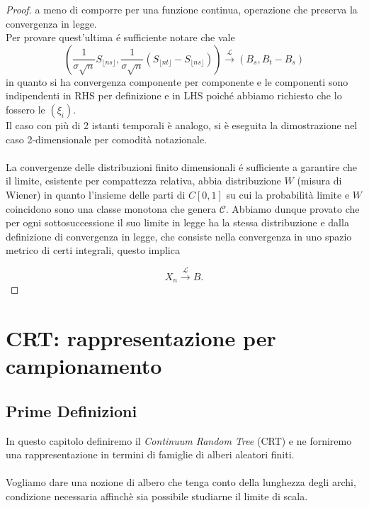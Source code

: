 \documentclass[11pt, twoside]{report}
\theoremstyle{definition}
\theoremstyle{plain}
\theoremstyle{remark}
\numberwithin{equation}{chapter}
\begin{document}
\begin{proof}
a meno di comporre per una funzione continua, operazione che preserva la convergenza in legge. \\
Per provare quest'ultima \'e sufficiente notare che vale 
$$\left(\frac{1}{\sigma \sqrt n}S_{\lfloor ns \rfloor}, \frac{1}{\sigma \sqrt n}\left(S_{\lfloor nt \rfloor} - S_{\lfloor ns \rfloor}\right)\right)\xrightarrow{\mathscr L}(B_s,B_t-B_s) $$
in quanto si ha convergenza componente per componente e le componenti sono indipendenti in RHS per definizione e in LHS poich\'e abbiamo richiesto che lo fossero le $(\xi_i)$. \\
Il caso con più di 2 istanti temporali è analogo, si è eseguita la dimostrazione nel caso 2-dimensionale per comodità notazionale.\\
\\
La convergenze delle distribuzioni finito dimensionali \'e sufficiente a garantire che il limite, esistente per compattezza relativa, abbia distribuzione $W$ (misura di Wiener) in quanto l'insieme delle parti di $C[0,1]$ su cui la probabilità limite e $W$ coincidono sono una classe monotona che genera $\mathscr C$. Abbiamo dunque provato che per ogni sottosuccessione il suo limite in legge ha la stessa distribuzione e dalla definizione di convergenza in legge, che consiste nella convergenza in uno spazio metrico di certi integrali, questo implica

 $$X_n \xrightarrow{\mathscr{L}} B.$$

\end{proof}


\chapter{CRT: rappresentazione per campionamento}
\section{Prime Definizioni}

In questo capitolo definiremo il \textit{Continuum Random Tree} (CRT) e ne forniremo una rappresentazione in termini di famiglie di alberi aleatori finiti.\\
\\
Vogliamo dare una nozione di albero che tenga conto della lunghezza degli archi, condizione necessaria affinchè sia possibile studiarne il limite di scala.
\end{document}
